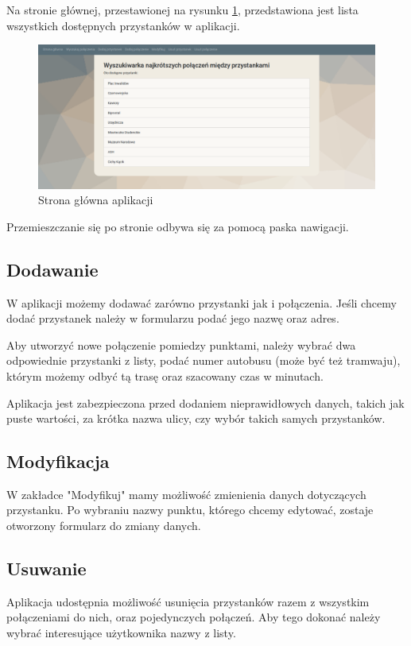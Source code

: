 \documentclass[12pt]{article}
\begin{document}
Na stronie głównej, przestawionej na rysunku \ref{fig:rys1}, przedstawiona jest lista wszystkich dostępnych przystanków w aplikacji.

\begin{figure}
\begin{center}
\includegraphics[width=14cm]{strona.png} 
\caption{Strona główna aplikacji} \label{fig:rys1}
\end{center}
\end{figure}

Przemieszczanie się po stronie odbywa się za pomocą paska nawigacji.

\subsection{Dodawanie}
W aplikacji możemy dodawać zarówno przystanki jak i połączenia. Jeśli chcemy dodać przystanek należy w formularzu podać jego nazwę oraz adres. 

Aby utworzyć nowe połączenie pomiedzy punktami, należy wybrać dwa odpowiednie przystanki z listy, podać numer autobusu (może być też tramwaju), którym możemy odbyć tą trasę oraz szacowany czas w minutach.

Aplikacja jest zabezpieczona przed dodaniem nieprawidłowych danych, takich jak puste wartości, za krótka nazwa ulicy, czy wybór takich samych przystanków.

\subsection{Modyfikacja}
W zakładce "Modyfikuj" mamy możliwość zmienienia danych dotyczących przystanku. Po wybraniu nazwy punktu, którego chcemy edytować, zostaje otworzony formularz do zmiany danych.

\subsection{Usuwanie}
Aplikacja udostępnia możliwość usunięcia przystanków razem z wszystkim połączeniami do nich, oraz pojedynczych połączeń. Aby tego dokonać należy wybrać interesujące użytkownika nazwy z listy.
\end{document}
